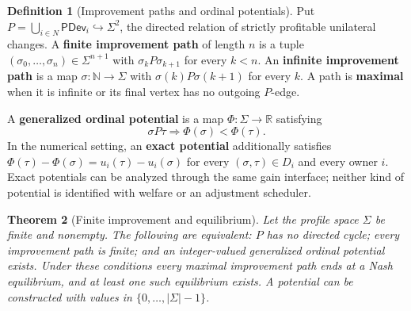 \documentclass[11pt,a4paper]{article}
\numberwithin{equation}{section}
\newtheorem{theorem}{Theorem}[section]
\theoremstyle{definition}
\newtheorem{definition}[theorem]{Definition}
\theoremstyle{remark}
\theoremstyle{plain}
\begin{document}
\begin{definition}[Improvement paths and ordinal potentials]
\label{def:egt-improvement-paths-and-ordinal-potentials}
Put $P=\bigcup_{i\in N}\mathsf{PDev}_i\hookrightarrow\Sigma^2$,
the directed relation of strictly profitable unilateral changes.
A \textbf{finite improvement path} of length $n$ is a tuple
$(\sigma_0,\ldots,\sigma_n)\in\Sigma^{n+1}$ with
$\sigma_kP\sigma_{k+1}$ for every $k<n$. An \textbf{infinite
improvement path} is a map $\sigma:\mathbb N\to\Sigma$ with
$\sigma(k)P\sigma(k+1)$ for every $k$. A path is \textbf{maximal} when
it is infinite or its final vertex has no outgoing $P$-edge.

A \textbf{generalized ordinal potential} is a map
$\Phi:\Sigma\to\mathbb R$ satisfying
\[
 \sigma P\tau\Longrightarrow\Phi(\sigma)<\Phi(\tau).
\]
In the numerical setting, an \textbf{exact potential} additionally
satisfies $\Phi(\tau)-\Phi(\sigma)=u_i(\tau)-u_i(\sigma)$
for every $(\sigma,\tau)\in D_i$ and every owner $i$.
Exact potentials can be analyzed through the same gain interface; neither kind
of potential is identified with welfare or an adjustment scheduler.
\end{definition}
\begin{theorem}[Finite improvement and equilibrium]
\label{thm:egt-finite-improvement}
Let the profile space $\Sigma$ be finite and nonempty. The following are
equivalent: $P$ has no directed cycle; every
improvement path is finite; and an integer-valued generalized ordinal
potential exists. Under these conditions every maximal improvement
path ends at a Nash equilibrium, and at least one such equilibrium
exists. A potential can be constructed with values in
$\{0,\ldots,|\Sigma|-1\}$.
\end{theorem}
\end{document}
